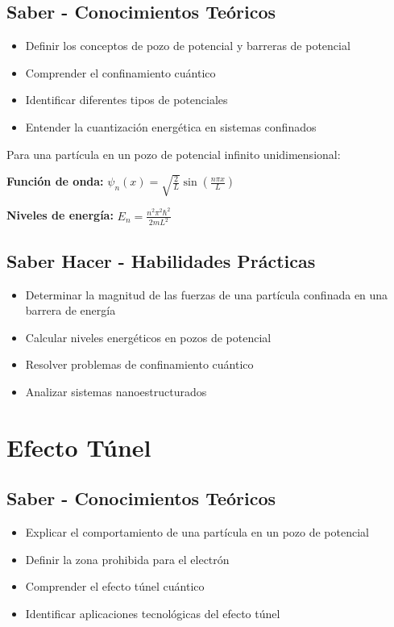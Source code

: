 \documentclass[12pt,a4paper,twoside]{book}
\begin{document}
	\subsection{Saber - Conocimientos Teóricos}
	\begin{saberbox}
		\begin{itemize}
			\item Definir los conceptos de pozo de potencial y barreras de potencial
			\item Comprender el confinamiento cuántico
			\item Identificar diferentes tipos de potenciales
			\item Entender la cuantización energética en sistemas confinados
		\end{itemize}
	\end{saberbox}
	
	Para una partícula en un pozo de potencial infinito unidimensional:
	
	\begin{ecuacionbox}
		\textbf{Función de onda:}
		$\psi_n(x) = \sqrt{\frac{2}{L}} \sin\left(\frac{n\pi x}{L}\right)$
		
		\textbf{Niveles de energía:}
		$E_n = \frac{n^2 \pi^2 \hbar^2}{2mL^2}$
	\end{ecuacionbox}
	
	\subsection{Saber Hacer - Habilidades Prácticas}
	\begin{hacerbox}
		\begin{itemize}
			\item Determinar la magnitud de las fuerzas de una partícula confinada en una barrera de energía
			\item Calcular niveles energéticos en pozos de potencial
			\item Resolver problemas de confinamiento cuántico
			\item Analizar sistemas nanoestructurados
		\end{itemize}
	\end{hacerbox}
	
	\section{Efecto Túnel}
	\label{sec:efecto_tunel}
	
	\subsection{Saber - Conocimientos Teóricos}
	\begin{saberbox}
		\begin{itemize}
			\item Explicar el comportamiento de una partícula en un pozo de potencial
			\item Definir la zona prohibida para el electrón
			\item Comprender el efecto túnel cuántico
			\item Identificar aplicaciones tecnológicas del efecto túnel
		\end{itemize}
	\end{saberbox}
	
\end{document}
